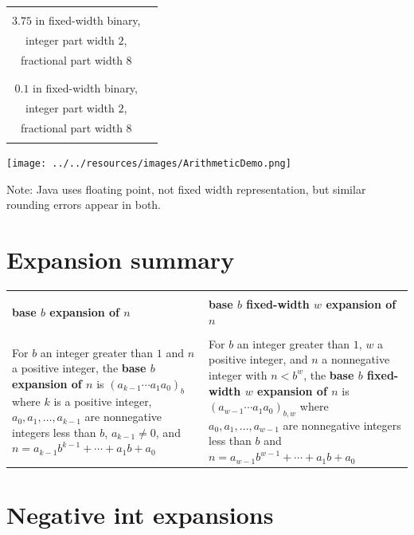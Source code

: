 \documentclass[12pt, oneside]{article}
\begin{document}
\begin{center}
\begin{tabular}{|c|p{5in}|}
\hline
& \\
$3.75$  in fixed-width binary,& \\
integer part width $2$,&\\
 fractional part width $8$ & \\
& \\
\hline
& \\
$0.1$  in fixed-width binary, & \\
integer part width $2$, &\\
 fractional part width $8$ & \\
& \\
\hline
\end{tabular}
\end{center}

\texttt{[image: ../../resources/images/ArithmeticDemo.png]}

Note: Java uses floating point, not fixed width representation, but similar rounding errors appear in both.
 \vfill
\section*{Expansion summary}


\begin{center}
    \begin{tabular}{|p{3.7in}|p{3.7in}|}
    \hline 
    &   \\
    {\bf base $b$ expansion of $n$}  & {\bf base $b$ fixed-width $w$ expansion of $n$}  \\
    & \\
    \hline  
    For $b$ an integer greater than $1$ and $n$ a positive integer, 
    the {\bf base $b$ expansion of $n$}  is $(a_{k-1} \cdots a_1 a_0)_b$
    where $k$ is a positive integer, $a_0, a_1, \ldots, a_{k-1}$ are nonnegative integers 
    less than $b$, $a_{k-1} \neq  0$, and $n =  a_{k-1} b^{k-1} + \cdots + a_1b + a_0$
    & 
    For $b$ an integer greater than $1$, $w$ a positive integer, and $n$ a nonnegative integer
    with $n <  b^w$, the {\bf base $b$ fixed-width $w$ expansion of $n$}  is
    $(a_{w-1} \cdots a_1 a_0)_{b,w}$
    where  $a_0, a_1, \ldots, a_{w-1}$ are nonnegative integers less than $b$ and 
    $n =  a_{w-1} b^{w-1} + \cdots + a_1b + a_0$\\
    \hline
    \end{tabular}
\end{center} \vfill
\section*{Negative int expansions}
\end{document}
